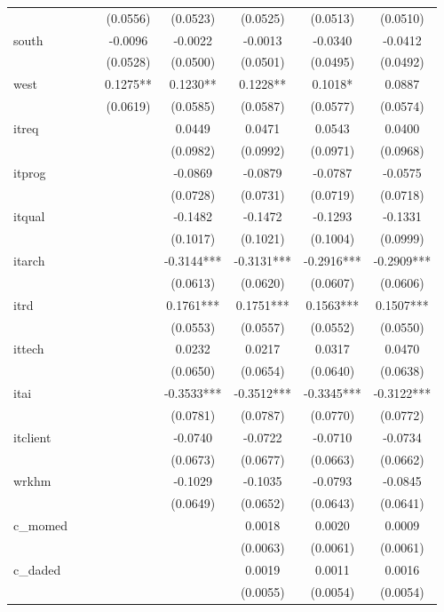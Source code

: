 \begin{table}[htbp]
\begin{tabular}{lccccccc}
 &  &  & (0.0556) & (0.0523) & (0.0525) & (0.0513) & (0.0510) \\
south &  &  & -0.0096 & -0.0022 & -0.0013 & -0.0340 & -0.0412 \\
 &  &  & (0.0528) & (0.0500) & (0.0501) & (0.0495) & (0.0492) \\
west &  &  & 0.1275** & 0.1230** & 0.1228** & 0.1018* & 0.0887 \\
 &  &  & (0.0619) & (0.0585) & (0.0587) & (0.0577) & (0.0574) \\
itreq &  &  &  & 0.0449 & 0.0471 & 0.0543 & 0.0400 \\
 &  &  &  & (0.0982) & (0.0992) & (0.0971) & (0.0968) \\
itprog &  &  &  & -0.0869 & -0.0879 & -0.0787 & -0.0575 \\
 &  &  &  & (0.0728) & (0.0731) & (0.0719) & (0.0718) \\
itqual &  &  &  & -0.1482 & -0.1472 & -0.1293 & -0.1331 \\
 &  &  &  & (0.1017) & (0.1021) & (0.1004) & (0.0999) \\
itarch &  &  &  & -0.3144*** & -0.3131*** & -0.2916*** & -0.2909*** \\
 &  &  &  & (0.0613) & (0.0620) & (0.0607) & (0.0606) \\
itrd &  &  &  & 0.1761*** & 0.1751*** & 0.1563*** & 0.1507*** \\
 &  &  &  & (0.0553) & (0.0557) & (0.0552) & (0.0550) \\
ittech &  &  &  & 0.0232 & 0.0217 & 0.0317 & 0.0470 \\
 &  &  &  & (0.0650) & (0.0654) & (0.0640) & (0.0638) \\
itai &  &  &  & -0.3533*** & -0.3512*** & -0.3345*** & -0.3122*** \\
 &  &  &  & (0.0781) & (0.0787) & (0.0770) & (0.0772) \\
itclient &  &  &  & -0.0740 & -0.0722 & -0.0710 & -0.0734 \\
 &  &  &  & (0.0673) & (0.0677) & (0.0663) & (0.0662) \\
wrkhm &  &  &  & -0.1029 & -0.1035 & -0.0793 & -0.0845 \\
 &  &  &  & (0.0649) & (0.0652) & (0.0643) & (0.0641) \\
c\_momed &  &  &  &  & 0.0018 & 0.0020 & 0.0009 \\
 &  &  &  &  & (0.0063) & (0.0061) & (0.0061) \\
c\_daded &  &  &  &  & 0.0019 & 0.0011 & 0.0016 \\
 &  &  &  &  & (0.0055) & (0.0054) & (0.0054) \\

\end{tabular}
\end{table}

